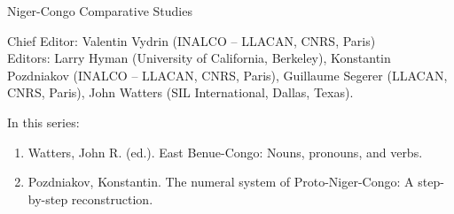 {\large Niger-Congo Comparative Studies}

\bigskip

Chief Editor:  Valentin Vydrin (INALCO – LLACAN, CNRS, Paris) \\
Editors:      
    Larry Hyman (University of California, Berkeley),
    Konstantin Pozdniakov (INALCO – LLACAN, CNRS, Paris),
    Guillaume Segerer (LLACAN, CNRS, Paris),
    John Watters (SIL International, Dallas, Texas).


\bigskip

In this series:

\begin{enumerate}
\item Watters, John R. (ed.). East Benue-Congo: Nouns, pronouns, and verbs.
\item Pozdniakov, Konstantin. The numeral system of Proto-Niger-Congo: A step-by-step reconstruction.
\end{enumerate}

 
